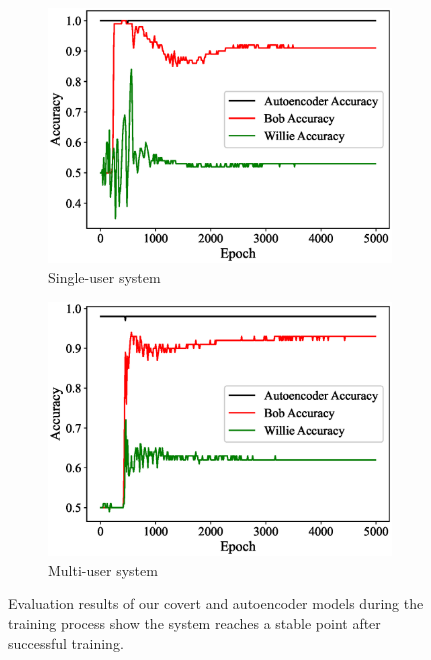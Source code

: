 \begin{figure}[bp!]
	\center
	\begin{subfigure}{0.24\textwidth}
		\includegraphics[width=\linewidth]{figs/training_progress}
		\caption{Single-user system}	
	\end{subfigure}
	\begin{subfigure}{0.24\textwidth}
		\includegraphics[width=\linewidth]{figs/multi_training_progress}
		\caption{Multi-user system}	
	\end{subfigure}
	\caption{Evaluation results of our covert and autoencoder models during the training process show the system reaches a stable point after successful training.}
	\label{fig:traning_progress}
\end{figure}

